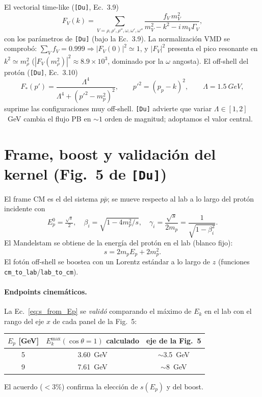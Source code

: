 \documentclass[11pt,a4paper]{article}
\newcommand{\Ek}{E_k}
\newcommand{\Du}{\texttt{[Du]}}
\begin{document}
El vectorial time-like (\Du, Ec.~3.9)
\begin{equation}
F_V(k)=\sum_{V=\rho,\rho',\rho'',\omega,\omega',\omega''}
\frac{f_V\,m_V^2}{m_V^2-k^2-i\,m_V\Gamma_V},
\end{equation}
con los par\'ametros de \Du{} (bajo la Ec.~3.9). La normalizaci\'on VMD se
comprob\'o: $\sum_V f_V=0.999\Rightarrow|F_V(0)|^2\simeq1$, y $|F_V|^2$
presenta el pico resonante en $k^2\simeq m_\rho^2$ ($|F_V(m_\rho^2)|^2\approx
8.9\times10^3$, dominado por la $\omega$ angosta). El off-shell del prot\'on
(\Du, Ec.~3.10)
\begin{equation}
F_\ast(p')=\frac{\Lambda^4}{\Lambda^4+(p'^2-m_p^2)^2},\qquad
p'^2=(p_p-k)^2,\qquad \Lambda=1.5~\si{GeV},
\end{equation}
suprime las configuraciones muy off-shell. \Du{} advierte que variar
$\Lambda\in[1,2]$~GeV cambia el flujo PB en $\sim\!1$ orden de magnitud;
adoptamos el valor central.

\section{Frame, boost y validaci\'on del kernel (Fig.~5 de \Du)}

El frame CM es el del sistema $p\bar p$; se mueve respecto al lab a lo largo
del prot\'on incidente con
\begin{equation}
E_p^0=\tfrac{\sqrt{s}}{2},\quad
\beta_i=\sqrt{1-4m_p^2/s},\quad
\gamma_i=\frac{\sqrt{s}}{2m_p}=\frac{1}{\sqrt{1-\beta_i^2}} .
\end{equation}
El Mandelstam se obtiene de la energ\'ia del prot\'on en el lab (blanco fijo):
\begin{equation}
s=2m_pE_p+2m_p^2 .
\label{eq:s_from_Ep}
\end{equation}
El fot\'on off-shell se boostea con un Lorentz est\'andar a lo largo de $z$
(funciones \texttt{cm\_to\_lab}/\texttt{lab\_to\_cm}).

\paragraph{Endpoints cinem\'aticos.} La Ec.~\eqref{eq:s_from_Ep} se
\emph{valid\'o} comparando el m\'aximo de $\Ek$ en el lab con el rango del eje
$x$ de cada panel de la Fig.~5:
\begin{center}
\begin{tabular}{ccc}
\toprule
$E_p$ [GeV] & $\Ek^{\max}(\cos\theta{=}1)$ calculado & eje de la Fig.~5 \\
\midrule
5 & \SI{3.60}{GeV} & $\sim$\SI{3.5}{GeV} \\
9 & \SI{7.61}{GeV} & $\sim$\SI{8}{GeV} \\
\bottomrule
\end{tabular}
\end{center}
El acuerdo ($<3\%$) confirma la elecci\'on de $s(E_p)$ y del boost.
\end{document}

